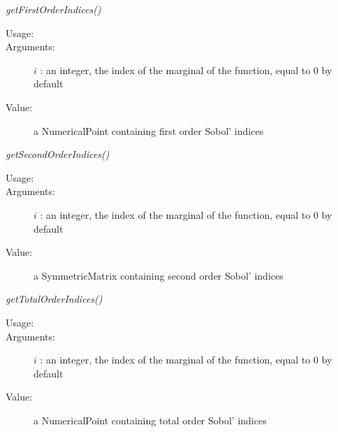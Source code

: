 \begin{description}
\begin{description}
\item \textit{getFirstOrderIndices()}
\begin{description}
\item[Usage:] \strut
{}
\item[Arguments:] $i$ : an integer, the index of the marginal of the function, equal to 0 by default
\item[Value:] a NumericalPoint containing first order Sobol' indices
\end{description}
\bigskip

\item \textit{getSecondOrderIndices()}
\begin{description}
\item[Usage:] \strut
{}
\item[Arguments:] $i$ : an integer, the index of the marginal of the function, equal to 0 by default
\item[Value:] a SymmetricMatrix containing second order Sobol' indices
\end{description}
\bigskip

\item \textit{getTotalOrderIndices()}
\begin{description}
\item[Usage:] \strut
{}
\item[Arguments:] $i$ : an integer, the index of the marginal of the function, equal to 0 by default
\item[Value:] a NumericalPoint containing total order Sobol' indices
\end{description}
\bigskip

\end{description}

\end{description}

